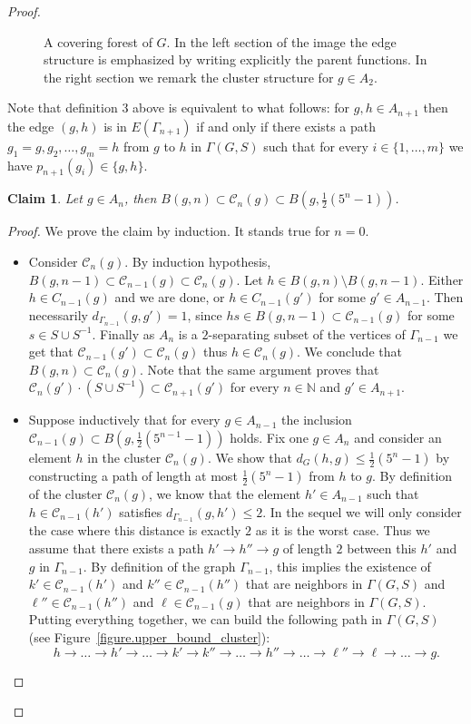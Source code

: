 \documentclass[letterpaper]{article}
\theoremstyle{plain}
\newtheorem{claim}{Claim}[section]
\def\NN{\mathbb{N}}
\def\CC{\mathcal{C}}
\begin{document}
\begin{proof}
		
		\begin{figure}[!ht]
			\centering
			
			\caption{A covering forest of $G$. In the left section of the image the edge structure is emphasized by writing explicitly the parent functions. In the right section we remark the cluster structure for $g \in A_2$.}
			\label{figure.covering_tree}
		\end{figure}
		
		Note that definition 3 above is equivalent to what follows: for $g,h \in A_{n+1}$ then the edge $(g,h)$ is in $E(\Gamma_{n+1}) $ if and only if there exists a path $g_1=g,g_2, \dots ,g_m=h$ from $g$ to $h$ in $\Gamma(G,S)$ such that for every $i \in \{1,\dots,m\}$ we have $p_{n+1}(g_i) \in \{g,h\}$.
		
		\begin{claim}\label{claimbolas}
			Let $g \in A_n$, then $B(g,n) \subset \CC_n(g) \subset B(g,\frac{1}{2}(5^n-1))$.
		\end{claim}
		\begin{proof}
			We prove the claim by induction. It stands true for $n = 0$.
			\begin{itemize}
				\item Consider $\CC_n(g)$. By induction hypothesis, $B(g,n-1) \subset \CC_{n-1}(g) \subset \CC_{n}(g)$. Let $h \in B(g,n)\setminus B(g,n-1)$. Either $h \in C_{n-1}(g)$ and we are done, or $h \in C_{n-1}(g')$ for some $g'\in A_{n-1}$. Then necessarily $d_{\Gamma_{n-1}}(g,g')=1$, since $hs\in B(g,n-1) \subset \CC_{n-1}(g)$ for some $s\in S\cup S^{-1}$. Finally as $A_{n}$ is a $2$-separating subset of the vertices of $\Gamma_{n-1}$ we get that $\CC_{n-1}(g') \subset \CC_{n}(g)$ thus $h \in \CC_{n}(g)$. We conclude that $B(g,n) \subset \CC_n(g)$. Note that the same argument proves that $\CC_{n}(g')\cdot(S\cup S^{-1})\subset \CC_{n+1}(g')$ for every $n\in\NN$ and $g' \in A_{n+1}$.
				
				\item Suppose inductively that for every $g \in A_{n-1}$ the inclusion $\CC_{n-1}(g) \subset B(g,\frac{1}{2}(5^{n-1}-1))$ holds. Fix one $g\in A_n$ and consider an element $h$ in the cluster $\CC_{n}(g)$. We show that $d_G(h,g)\leq \frac{1}{2}(5^{n}-1)$ by constructing a path of length at most $\frac{1}{2}(5^{n}-1)$ from $h$ to $g$. By definition of the cluster $\CC_n(g)$, we know that the element $h'\in A_{n-1}$ such that $h\in\CC_{n-1}(h')$ satisfies $d_{\Gamma_{n-1}}(g,h')\leq2$. In the sequel we will only consider the case where this distance is exactly $2$ as it is the worst case. Thus we assume that there exists a path $h'\to h''\to g$ of length $2$ between this $h'$ and $g$ in $\Gamma_{n-1}$. By definition of the graph $\Gamma_{n-1}$, this implies the existence of $k'\in\CC_{n-1}(h')$ and $k''\in\CC_{n-1}(h'')$ that are neighbors in $\Gamma(G,S)$ and $\ell''\in\CC_{n-1}(h'')$ and $\ell\in\CC_{n-1}(g)$ that are neighbors in $\Gamma(G,S)$. Putting everything together, we can build the following path 
in	$\Gamma(G,S)$ (see Figure~\ref{figure.upper_bound_cluster}): $$ h \to \dots \to h'\to \dots \to k' \to k'' \to \dots \to h''\to \dots \to \ell''\to \ell \to \dots \to g. $$
				

\end{itemize}
\end{proof}
\end{proof}
\end{document}

